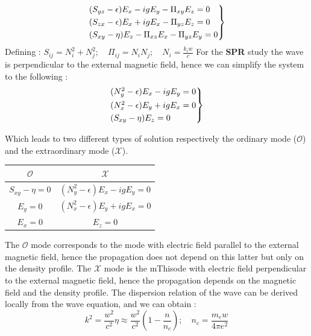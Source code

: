 \documentclass[11pt,a4paper,openany]{report}
\begin{document}
\begin{multicols}{2}
    \begin{equation}
        \begin{rcases}
            (S_{yz} - \epsilon)E_x - igE_y - \Pi_{xy}E_z = 0 \\
            (S_{zx} - \epsilon)E_x + igE_x - \Pi_{yz}E_z = 0 \\
            (S_{xy} - \eta)E_z -\Pi_{xz}E_x - \Pi_{yz}E_y = 0
        \end{rcases}
    \end{equation}
    Defining : $S_{ij} = N_i^2 + N_j^2; \quad \Pi_{ij} = N_iN_j ; \quad N_{i} = \frac{k_iw}{c}$
    For the \textbf{SPR} study the wave is perpendicular to the external magnetic field, hence we can simplify the system to the following :
    \begin{equation}
        \begin{rcases}
            (N_y^2 - \epsilon)E_x - igE_y = 0 \\
            (N_x^2 - \epsilon)E_y + igE_x = 0 \\
            (S_{xy} - \eta)E_z = 0
        \end{rcases}
    \end{equation}

    Which leads to two different types of solution respectively the ordinary mode ($\mathcal{O}$) and the extraordinary mode ($\mathcal{X}$).
    \setlength{\tabcolsep}{18pt}
    \renewcommand{\arraystretch}{1.5}
    \begin{center}
        \begin{tabular}{|| c  | c||}
            \hline
            $\mathcal{O}$       & $\mathcal{X}$                       \\
            \hline\hline
            $S_{xy} - \eta = 0$ & $(N_y^2 - \epsilon)E_x - igE_y = 0$ \\
            $E_y = 0$           & $(N_x^2 - \epsilon)E_y + igE_x = 0$ \\
            $E_x = 0$           & $E_z = 0$                           \\
            \hline
        \end{tabular}
    \end{center}
    The $\mathcal{O}$ mode corresponds to the mode with electric field parallel to the external magnetic field, hence the propagation does not depend on this latter but only on the density profile. The $\mathcal{X}$ mode is the mThisode with electric field perpendicular to the external magnetic field, hence the propagation depends on the magnetic field and the density profile. The dispersion relation of the wave can be derived locally from the wave equation, and we can obtain :
    \begin{equation}
        k^2 = \frac{w^2}{c^2} \eta \approx \frac{w^2}{c^2}\left(1 - \frac{n}{n_c}\right); \quad n_c = \frac{m_ew}{4 \pi e^2}
        \label{eq:Dispersion_relation}
    \end{equation}


\end{multicols}
\end{document}
